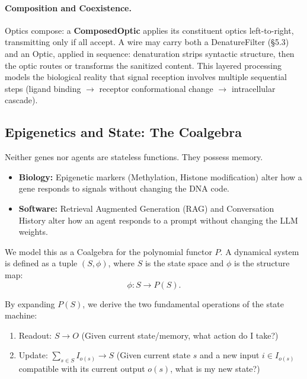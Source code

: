 \paragraph{Composition and Coexistence.}
Optics compose: a \textbf{ComposedOptic} applies its constituent optics left-to-right, transmitting only if all accept. A wire may carry both a DenatureFilter (\S5.3) and an Optic, applied in sequence: denaturation strips syntactic structure, then the optic routes or transforms the sanitized content. This layered processing models the biological reality that signal reception involves multiple sequential steps (ligand binding $\to$ receptor conformational change $\to$ intracellular cascade).

\subsection{Epigenetics and State: The Coalgebra}
\label{sec:coalgebra}

Neither genes nor agents are stateless functions. They possess memory.
\begin{itemize}[leftmargin=*]
\item \textbf{Biology:} Epigenetic markers (Methylation, Histone modification) alter how a gene responds to
signals without changing the DNA code.
\item \textbf{Software:} Retrieval Augmented Generation (RAG) and Conversation History alter how an agent
responds to a prompt without changing the LLM weights.
\end{itemize}

We model this as a Coalgebra for the polynomial functor $P$. A dynamical system is defined as a tuple $(S,\phi)$,
where $S$ is the state space and $\phi$ is the structure map:
\begin{equation}
\phi: S \to P(S).
\label{eq:coalgebra-structure}
\end{equation}

By expanding $P(S)$, we derive the two fundamental operations of the state machine:
\begin{enumerate}[leftmargin=*]
\item Readout: $S \to O$ (Given current state/memory, what action do I take?)
\item Update: $\displaystyle \sum_{s\in S} I_{o(s)} \to S$ (Given current state $s$ and a new input
$i\in I_{o(s)}$ compatible with its current output $o(s)$, what is my new state?)
\end{enumerate}

